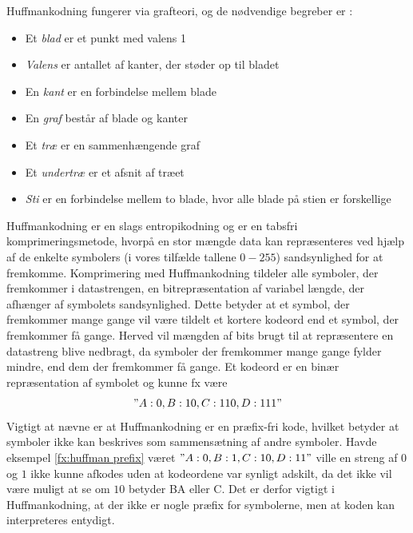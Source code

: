 Huffmankodning fungerer via grafteori, og de nødvendige begreber er \citep{grafteori}:
\begin{itemize}
\item Et \emph{blad} er et punkt med valens 1
\item \emph{Valens} er antallet af kanter, der støder op til bladet
\item En \emph{kant} er en forbindelse mellem blade
\item En \emph{graf} består af blade og kanter
\item Et \emph{træ} er en sammenhængende graf
\item Et \emph{undertræ} er et afsnit af træet
\item \emph{Sti} er en forbindelse mellem to blade, hvor alle blade på stien er forskellige
\end{itemize}

Huffmankodning er en slags entropikodning og er en tabsfri komprimeringsmetode, hvorpå en stor mængde data kan repræsenteres ved hjælp af de enkelte symbolers (i vores tilfælde tallene $0-255$) sandsynlighed for at fremkomme. Komprimering med Huffmankodning tildeler alle symboler, der fremkommer i datastrengen, en bitrepræsentation af variabel længde, der afhænger af symbolets sandsynlighed. Dette betyder at et symbol, der fremkommer mange gange vil være tildelt et kortere kodeord end et symbol, der fremkommer få gange. Herved vil mængden af bits brugt til at repræsentere en datastreng blive nedbragt, da symboler der fremkommer mange gange fylder mindre, end dem der fremkommer få gange. Et kodeord er en binær repræsentation af symbolet og kunne fx være
\begin{align}
"A: 0, B: 10, C: 110, D: 111"
\label{fx:huffman prefix}
\end{align}
Vigtigt at nævne er at Huffmankodning er en præfix-fri kode, hvilket betyder at symboler ikke kan beskrives som sammensætning af andre symboler. Havde eksempel \vref{fx:huffman prefix} været $"A: 0, B: 1, C: 10, D: 11"$ ville en streng af $0$ og $1$ ikke kunne afkodes uden at kodeordene var synligt adskilt, da det ikke vil være muligt at se om $10$ betyder BA eller C. Det er derfor vigtigt i Huffmankodning, at der ikke er nogle præfix for symbolerne, men at koden kan interpreteres entydigt.

